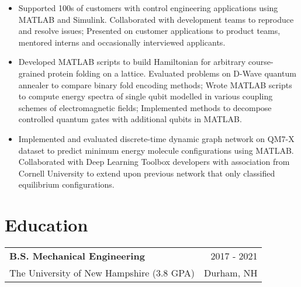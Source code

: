 \documentclass[11pt,a4paper,sans]{moderncv}
\makeatletter
\newcommand{\role}[4]{
  \vspace{0cm}
    \begin{tabular*}{1\textwidth}[t]{l@{\extracolsep{\fill}}r}
      \textbf{#1} & #2 \\ #3 & #4
    \end{tabular*}
    \vspace{-0.3cm}
}
\makeatother
\begin{document}
{\begin{itemize}[leftmargin=0.5cm, label={\textbullet}]

\item Supported 100s of customers with control engineering applications using MATLAB and Simulink. Collaborated with development teams to reproduce and resolve issues; Presented on customer applications to product teams, mentored interns and occasionally interviewed applicants.

\item Developed MATLAB scripts to build Hamiltonian for arbitrary course-grained protein folding on a lattice. Evaluated problems on D-Wave quantum annealer to compare binary fold encoding methods; Wrote MATLAB scripts to compute energy spectra of single qubit modelled in various coupling schemes of electromagnetic fields; Implemented methods to decompose controlled quantum gates with additional qubits in MATLAB.

\item Implemented and evaluated discrete-time dynamic graph network on QM7-X dataset to predict minimum energy molecule configurations using MATLAB. Collaborated with Deep Learning Toolbox developers with association from Cornell University to extend upon previous network that only classified equilibrium configurations.

\end{itemize}}

\section{Education}

\role
      {B.S. Mechanical Engineering}{2017 ‐ 2021}
      {The University of New Hampshire (3.8 GPA)}{Durham, NH}
\end{document}

